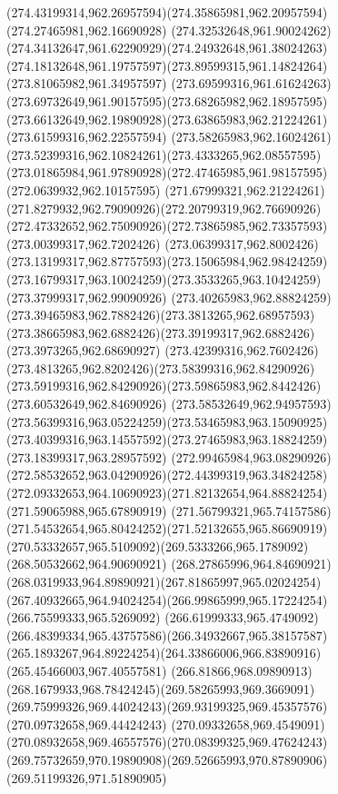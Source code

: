 {{		\curveto(274.43199314,962.26957594)(274.35865981,962.20957594)(274.27465981,962.16690928)
		\curveto(274.32532648,961.90024262)(274.34132647,961.62290929)(274.24932648,961.38024263)
		\curveto(274.18132648,961.19757597)(273.89599315,961.14824264)(273.81065982,961.34957597)
		\curveto(273.69599316,961.61624263)(273.69732649,961.90157595)(273.68265982,962.18957595)
		\curveto(273.66132649,962.19890928)(273.63865983,962.21224261)(273.61599316,962.22557594)
		\curveto(273.58265983,962.16024261)(273.52399316,962.10824261)(273.4333265,962.08557595)
		\curveto(273.01865984,961.97890928)(272.47465985,961.98157595)(272.0639932,962.10157595)
		\curveto(271.67999321,962.21224261)(271.8279932,962.79090926)(272.20799319,962.76690926)
		\curveto(272.47332652,962.75090926)(272.73865985,962.73357593)(273.00399317,962.7202426)
		\curveto(273.06399317,962.8002426)(273.13199317,962.87757593)(273.15065984,962.98424259)
		\curveto(273.16799317,963.10024259)(273.3533265,963.10424259)(273.37999317,962.99090926)
		\curveto(273.40265983,962.88824259)(273.39465983,962.7882426)(273.3813265,962.68957593)
		\curveto(273.38665983,962.6882426)(273.39199317,962.6882426)(273.3973265,962.68690927)
		\curveto(273.42399316,962.7602426)(273.4813265,962.8202426)(273.58399316,962.84290926)
		\curveto(273.59199316,962.84290926)(273.59865983,962.8442426)(273.60532649,962.84690926)
		\curveto(273.58532649,962.94957593)(273.56399316,963.05224259)(273.53465983,963.15090925)
		\curveto(273.40399316,963.14557592)(273.27465983,963.18824259)(273.18399317,963.28957592)
		\curveto(272.99465984,963.08290926)(272.58532652,963.04290926)(272.44399319,963.34824258)
		\curveto(272.09332653,964.10690923)(271.82132654,964.88824254)(271.59065988,965.67890919)
		\curveto(271.56799321,965.74157586)(271.54532654,965.80424252)(271.52132655,965.86690919)
		\curveto(270.53332657,965.5109092)(269.5333266,965.1789092)(268.50532662,964.90690921)
		\curveto(268.27865996,964.84690921)(268.0319933,964.89890921)(267.81865997,965.02024254)
		\curveto(267.40932665,964.94024254)(266.99865999,965.17224254)(266.75599333,965.5269092)
		\curveto(266.61999333,965.4749092)(266.48399334,965.43757586)(266.34932667,965.38157587)
		\curveto(265.1893267,964.89224254)(264.33866006,966.83890916)(265.45466003,967.40557581)
		\curveto(266.81866,968.09890913)(268.1679933,968.78424245)(269.58265993,969.3669091)
		\curveto(269.75999326,969.44024243)(269.93199325,969.45357576)(270.09732658,969.44424243)
		\curveto(270.09332658,969.4549091)(270.08932658,969.46557576)(270.08399325,969.47624243)
		\curveto(269.75732659,970.19890908)(269.52665993,970.87890906)(269.51199326,971.51890905)
}}
